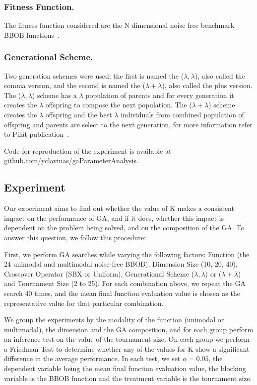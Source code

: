 \subsubsection*{Fitness Function.}
The fitness function considered are the N dimensional noise free
benchmark BBOB functions~\cite{hansen2010real}.

\subsubsection*{Generational Scheme.}
Two generation schemes were used, the first is named the ($\lambda,
\lambda$), also called the comma version, and the second is named the
($\lambda + \lambda$), also called the plus version. The ($\lambda,
\lambda$) scheme has a $\lambda$ population of parents and for every
generation it creates the $\lambda$ offspring to compose the next
population. The ($\lambda + \lambda$) scheme creates the $\lambda$
offspring and the best $\lambda$ individuals from combined population
of offspring and parents are select to the next
generation, for more information refer to Pil{\'a}t publication~\cite{pilat2017parallel}.

Code for reproduction of the experiment is available at github.com/yclavinas/gaParameterAnalysis.

\subsection{Experiment}\label{sec:experiment}

Our experiment aims to find out whether the value of K makes a
consistent impact on the performance of GA, and if it does, whether
this impact is dependent on the problem being solved, and on the
composition of the GA. To answer this question, we follow this procedure:

First, we perform GA searches while varying the following factors:
Function (the 24 unimodal and multimodal noise-free BBOB), Dimension
Size (10, 20, 40), Crossover Operator (SBX or Uniform), Generational
Scheme ($\lambda, \lambda$) or ($\lambda + \lambda$) and Tournament
Size (2 to 25). For each combination above, we repeat the GA search 40
times, and the mean final function evaluation value is chosen as the
representative value for that particular combination.

We group the experiments by the modality of the function (unimodal or
multimodal), the dimension and the GA composition, and for each group
perform an inference test on the value of the tournament size. On each
group we perform a Friedman Test to determine whether any of the
values for K show a significant difference in the average
performance. In each test, we set $\alpha = 0.05$, the dependent
variable being the mean final function evaluation value, the blocking
variable is the BBOB function and the treatment variable is the
tournament size.




